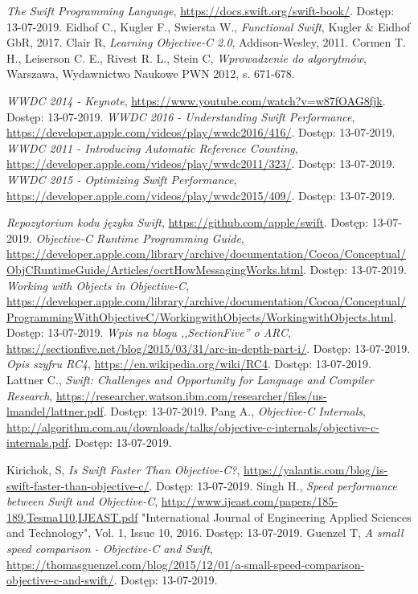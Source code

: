\documentclass[mgr, shortabstract]{iithesis}
\begin{document}
\begin{thebibliography}{1}
     \emph{The Swift Programming Language}, \url{https://docs.swift.org/swift-book/}. Dostęp: 13-07-2019.
     Eidhof C., Kugler F., Swiersta W., \emph{Functional Swift}, Kugler \& Eidhof GbR, 2017.
     Clair R, \emph{Learning Objective-C 2.0}, Addison-Wesley, 2011.
     Cormen T. H., Leiserson C. E., Rivest R. L., Stein C, \emph{Wprowadzenie do algorytmów}, Warszawa, Wydawnictwo Naukowe PWN 2012, s. 671-678.

     \emph{WWDC 2014 - Keynote}, \url{https://www.youtube.com/watch?v=w87fOAG8fjk}. Dostęp: 13-07-2019.
     \emph{WWDC 2016 - Understanding Swift Performance}, \url{https://developer.apple.com/videos/play/wwdc2016/416/}. Dostęp: 13-07-2019.
     \emph{WWDC 2011 - Introducing Automatic Reference Counting}, \url{https://developer.apple.com/videos/play/wwdc2011/323/}. Dostęp: 13-07-2019.
     \emph{WWDC 2015 - Optimizing Swift Performance}, \url{https://developer.apple.com/videos/play/wwdc2015/409/}. Dostęp: 13-07-2019.

     \emph{Repozytorium kodu języka Swift}, \url{https://github.com/apple/swift}. Dostęp: 13-07-2019.
     \emph{Objective-C Runtime Programming Guide}, \url{https://developer.apple.com/library/archive/documentation/Cocoa/Conceptual/ObjCRuntimeGuide/Articles/ocrtHowMessagingWorks.html}. Dostęp: 13-07-2019.
     \emph{Working with Objects in Objective-C}, \url{https://developer.apple.com/library/archive/documentation/Cocoa/Conceptual/ProgrammingWithObjectiveC/WorkingwithObjects/WorkingwithObjects.html}. Dostęp: 13-07-2019.
     \emph{Wpis na blogu ,,SectionFive'' o ARC}, \url{https://sectionfive.net/blog/2015/03/31/arc-in-depth-part-i/}. Dostęp: 13-07-2019.
     \emph{Opis szyfru RC4}, \url{https://en.wikipedia.org/wiki/RC4}. Dostęp: 13-07-2019.
     Lattner C., \emph{Swift: Challenges and Opportunity for Language and Compiler Research}, \url{https://researcher.watson.ibm.com/researcher/files/us-lmandel/lattner.pdf}. Dostęp: 13-07-2019.
     Pang A., \emph{Objective-C Internals}, \url{http://algorithm.com.au/downloads/talks/objective-c-internals/objective-c-internals.pdf}. Dostęp: 13-07-2019.

     Kirichok, S, \emph{Is Swift Faster Than Objective-C?}, \url{https://yalantis.com/blog/is-swift-faster-than-objective-c/}. Dostęp: 13-07-2019.
     Singh H., \emph{Speed performance between Swift and Objective-C}, \url{http://www.ijeast.com/papers/185-189,Tesma110,IJEAST.pdf} "International Journal of Engineering Applied Sciences and Technology", Vol. 1, Issue 10, 2016. Dostęp: 13-07-2019.
     Guenzel T, \emph{A small speed comparison - Objective-C and Swift}, \url{https://thomasguenzel.com/blog/2015/12/01/a-small-speed-comparison-objective-c-and-swift/}. Dostęp: 13-07-2019.

\end{thebibliography}                                                                                                                                                          
\end{document}
